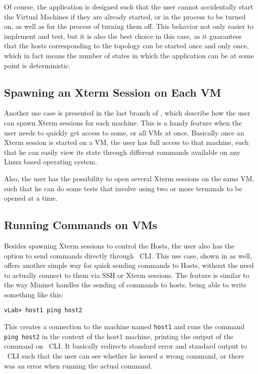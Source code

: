 Of course, the application is designed such that the user cannot accidentally start the Virtual Machines if they are already started, or in the process to be turned on, as well as for the process of turning them off.
This behavior not only easier to implement and test, but it is also the best choice in this case, as it guarantees that the hosts corresponding to the topology can be started once and only once, which in fact means the number of states in which the application can be at some point is deterministic.

\subsection{Spawning an Xterm Session on Each VM}
\label{sub-sec:spawn-xterm}

Another use case is presented in the last branch of  , which describe how the user can spawn Xterm sessions for each machine.
This is a handy feature when the user needs to quickly get access to some, or all VMs at once.
Basically once an Xterm session is started on a VM, the user has full access to that machine, such that he can easily view its state through different commands available on any Linux based operating system.

Also, the user has the possibility to open several Xterm sessions on the same VM, such that he can do some tests that involve using two or more terminals to be opened at a time.

\subsection{Running Commands on VMs}
\label{sub-sec:run-cmd}

Besides spawning Xterm sessions to control the Hosts, the user also has the option to send commands directly through \project\ CLI.
This use case, shown in  as well, offers another simple way for quick sending commands to Hosts, without the need to actually connect to them via SSH or Xterm sessions.
The feature is similar to the way Mininet handles the sending of commands to hosts, being able to write something like this:

\lstset{label=lst:ping-example}
\begin{lstlisting}
vLab> host1 ping host2
\end{lstlisting}

This creates a connection to the machine named \texttt{host1} and runs the command \texttt{ping host2} in the context of the host1 machine, printing the output of the command on \project\ CLI.
It basically redirects standard error and standard output to \project\ CLI such that the user can see whether he issued a wrong command, or there was an error when running the actual command.

